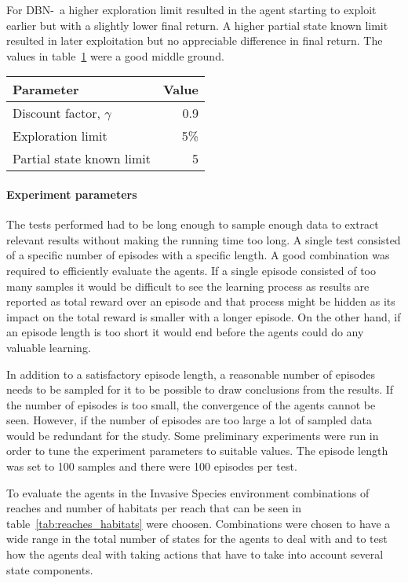For DBN-\etre\ a higher exploration limit resulted in the agent starting to
exploit earlier but with a slightly lower final return. A higher partial state
known limit resulted in later exploitation but no appreciable difference in
final return. The values in table~\ref{tab:dbne3_params} were a good middle
ground.

\begin{table}[H]
\label{tab:dbne3_params}
\centering
\begin{tabular}{lr}
 \toprule
 Parameter & Value \\
 \midrule
 Discount factor, $\gamma$ & 0.9 \\
 Exploration limit & 5\% \\
 Partial state known limit & 5 \\
 \bottomrule
\end{tabular}
\end{table}

\paragraph{Experiment parameters}

The tests performed had to be long enough to sample enough data to extract
relevant results without making the running time too long. A single test
consisted of a specific number of episodes with a specific length. A good
combination was required to efficiently evaluate the agents. If a single
episode consisted of too many samples it would be difficult to see the learning
process as results are reported as total reward over an episode and that
process might be hidden as its impact on the total reward is smaller with a
longer episode. On the other hand, if an episode length is too short it would
end before the agents could do any valuable learning.

In addition to a satisfactory episode length, a reasonable number of episodes
needs to be sampled for it to be possible to draw conclusions from the results.
If the number of episodes is too small, the convergence of the agents cannot be
seen. However, if the number of episodes are too large a lot of sampled data
would be redundant for the study. Some preliminary experiments were run in
order to tune the experiment parameters to suitable values. The episode length
was set to 100 samples and there were 100 episodes per test.

To evaluate the agents in the Invasive Species environment combinations of
reaches and number of habitats per reach that can be seen in
table~\ref{tab:reaches_habitats} were choosen. Combinations were chosen to have
a wide range in the total number of states for the agents to deal with and to
test how the agents deal with taking actions that have to take into account
several state components. 

